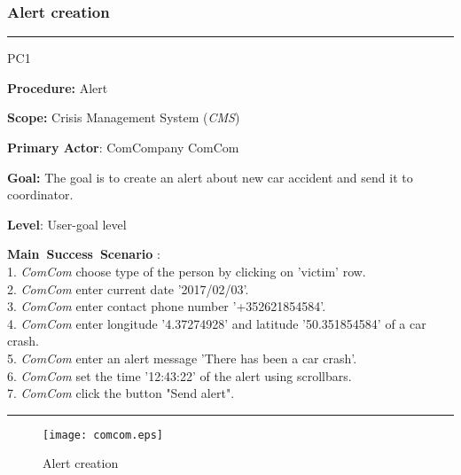 \subsubsection{Alert creation}
\vspace{0.5cm}
\hrule
\begin{lyxlist}{PC1}
\small{
\item [\textbf{Procedure:}] Alert
\item [\textbf{Scope:}]  Crisis Management System (\emph{CMS})
\item [\textbf{Primary Actor}:] ComCompany ComCom
\item [\textbf{Goal:}] The goal is to create an alert about new car accident and
send it to coordinator.
\item [\textbf{Level}:] User-goal level
\item [\textbf{Main~Success~Scenario}]:\\
1. \emph{ComCom} choose type of the person by clicking on 'victim' row. \\
2. \emph{ComCom} enter current date '2017/02/03'. \\
3. \emph{ComCom} enter contact phone number '+352621854584'. \\
4. \emph{ComCom} enter longitude '4.37274928' and latitude '50.351854584' of a
car crash.\\
5. \emph{ComCom} enter an alert message 'There has been a car crash'.\\
6. \emph{ComCom} set the time '12:43:22' of the alert using scrollbars.\\
7. \emph{ComCom} click the button "Send alert".\\
}
\end{lyxlist}
\hrule
\vspace{0.5cm}

\begin{figure}[h]
    \texttt{[image: comcom.eps]}
	\caption{Alert creation}
\end{figure}

